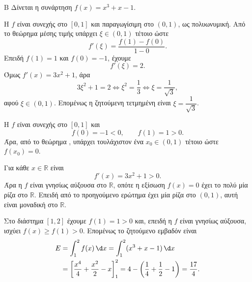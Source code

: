 \begin{thema}{Β}
Δίνεται η συνάρτηση $f(x) = x^3 + x - 1$.
\begin{erwthma}
\item Η $f$ είναι συνεχής στο $[0,1]$ και παραγωγίσιμη στο $(0,1)$, ως πολυωνυμική.
Από το θεώρημα μέσης τιμής υπάρχει $\xi\in(0,1)$ τέτοιο ώστε
\[
f'(\xi)=\frac{f(1)-f(0)}{1-0}.
\]
Επειδή $f(1)=1$ και $f(0)=-1$, έχουμε
\[
f'(\xi)=2.
\]
Όμως $f'(x)=3x^2+1$, άρα
\[
3\xi^2+1=2 \Leftrightarrow \xi^2=\frac{1}{3}
\Leftrightarrow \xi=\frac{1}{\sqrt{3}},
\]
αφού $\xi\in(0,1)$. Επομένως η ζητούμενη τετμημένη είναι
$\xi=\dfrac{1}{\sqrt{3}}$.

\item Η $f$ είναι συνεχής στο $[0,1]$ και
\[
f(0)=-1<0,\qquad f(1)=1>0.
\]
Άρα, από το θεώρημα , υπάρχει τουλάχιστον ένα
$x_0\in(0,1)$ τέτοιο ώστε $f(x_0)=0$.

\item Για κάθε $x\in\mathbb{R}$ είναι
\[
f'(x)=3x^2+1>0.
\]
Άρα η $f$ είναι γνησίως αύξουσα στο $\mathbb{R}$, οπότε η εξίσωση
$f(x)=0$ έχει το πολύ μία ρίζα στο $\mathbb{R}$. Επειδή από το προηγούμενο
ερώτημα έχει μία ρίζα στο $(0,1)$, αυτή είναι μοναδική στο $\mathbb{R}$.

\item Στο διάστημα $[1,2]$ έχουμε $f(1)=1>0$ και, επειδή η $f$ είναι γνησίως
αύξουσα, ισχύει $f(x)\ge f(1)>0$. Επομένως το ζητούμενο εμβαδόν είναι
\begin{align*}
E&=\int_1^2 f(x)\,\d x
=\int_1^2 (x^3+x-1)\,\d x\\
&=\left[\frac{x^4}{4}+\frac{x^2}{2}-x\right]_1^2
=4-\left(\frac14+\frac12-1\right)
=\frac{17}{4}.
\end{align*}
\end{erwthma}
\end{thema}

